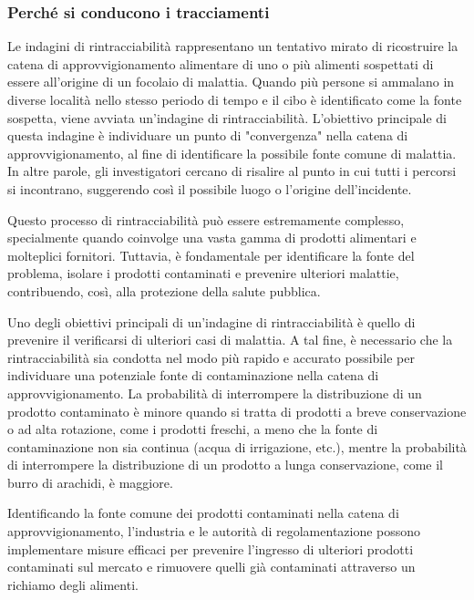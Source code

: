 \subsubsection{Perché si conducono i tracciamenti}

Le indagini di rintracciabilità rappresentano un tentativo mirato di ricostruire la catena di approvvigionamento alimentare di uno o più alimenti sospettati di essere all'origine di un focolaio di malattia. Quando più persone si ammalano in diverse località nello stesso periodo di tempo e il cibo è identificato come la fonte sospetta, viene avviata un'indagine di rintracciabilità. L'obiettivo principale di questa indagine è individuare un punto di "convergenza" nella catena di approvvigionamento, al fine di identificare la possibile fonte comune di malattia. In altre parole, gli investigatori cercano di risalire al punto in cui tutti i percorsi si incontrano, suggerendo così il possibile luogo o l'origine dell'incidente.

Questo processo di rintracciabilità può essere estremamente complesso, specialmente quando coinvolge una vasta gamma di prodotti alimentari e molteplici fornitori. Tuttavia, è fondamentale per identificare la fonte del problema, isolare i prodotti contaminati e prevenire ulteriori malattie, contribuendo, così, alla protezione della salute pubblica.

Uno degli obiettivi principali di un'indagine di rintracciabilità è quello di prevenire il verificarsi di ulteriori casi di malattia. A tal fine, è necessario che la rintracciabilità sia condotta nel modo più rapido e accurato possibile per individuare una potenziale fonte di contaminazione nella catena di approvvigionamento. La probabilità di interrompere la distribuzione di un prodotto contaminato è minore quando si tratta di prodotti a breve conservazione o ad alta rotazione, come i prodotti freschi, a meno che la fonte di contaminazione non sia continua (acqua di irrigazione, etc.), mentre la probabilità di interrompere la distribuzione di un prodotto a lunga conservazione, come il burro di arachidi, è maggiore.

Identificando la fonte comune dei prodotti contaminati nella catena di approvvigionamento, l'industria e le autorità di regolamentazione possono implementare misure efficaci per prevenire l'ingresso di ulteriori prodotti contaminati sul mercato e rimuovere quelli già contaminati attraverso un richiamo degli alimenti.

